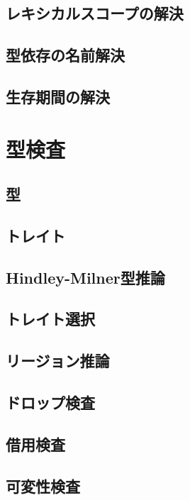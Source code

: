 \documentclass[dvipdfmx,uplatex,papersize,a4paper,10pt]{jsbook}
\theoremstyle{definition}
\begin{document}
\section{レキシカルスコープの解決}

\section{型依存の名前解決}

\section{生存期間の解決}



\chapter{型検査}

\section{型}

\section{トレイト}

\section{Hindley-Milner型推論}

\section{トレイト選択}

\section{リージョン推論}

\section{ドロップ検査}

\section{借用検査}

\section{可変性検査}
\end{document}
